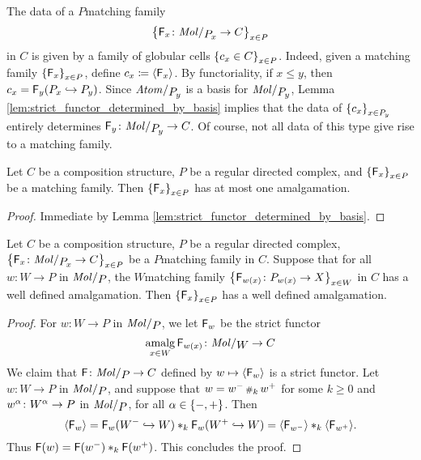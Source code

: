 \begin{rmk}\label{rmk:data_matching family}
    The data of a \( P \)\nbd matching family 
    \begin{equation*}
        \set{\F_x \colon \molecin{\imel{P}{x}} \to C}_{x \in P}
    \end{equation*}
    in \( C \) is given by a family of globular cells \( \left\{ {c_x \in C} \right\}_{x \in P} \).
    Indeed, given a matching family \( \left\{ {\mathsf{F}_x} \right\}_{x \in P} \), define \( c_x \coloneqq \langle\mathsf{F}_x\rangle \).
    By functoriality, if \( x \le y \), then \( c_x = \mathsf{F}_y({P}_{x} \hookrightarrow {P}_{y}) \).
    Since \( \atomin{\imel{P}{y}} \) is a basis for \( \molecin{\imel{P}{y}} \), Lemma \ref{lem:strict_functor_determined_by_basis} implies that the data of \( \left\{ {c_x} \right\}_{x \in {P}_{y}} \) entirely determines \( \F_y \colon \molecin{\imel{P}{y}} \to C \).
    Of course, not all data of this type give rise to a matching family. 
\end{rmk}

\begin{lem}\label{lem:at_most_one_lift}
    Let \( C \) be a composition structure, \( P \) be a regular directed complex, and \( \left\{ {\mathsf{F}_x} \right\}_{x \in P} \) be a matching family. 
    Then \( \left\{ {\mathsf{F}_x} \right\}_{x \in P} \) has at most one amalgamation.
\end{lem}
\begin{proof}
    Immediate by Lemma \ref{lem:strict_functor_determined_by_basis}.
\end{proof}

\begin{lem} \label{lem:well_define_from_regular_iff_well_defined_from_molecules}
    Let \( C \) be a composition structure, \( P \) be a regular directed complex, \( \set{\F_x \colon \molecin{\imel{P}{x}} \to C}_{x \in P} \) be a \( P \)\nbd matching family in \( C \). 
    Suppose that for all \( w \colon W \to P \) in \( \molecin{P} \), the \( W \)\nbd matching family \( \left\{ {\mathsf{F}_{w(x)} \colon {P}_{w(x)} \to X} \right\}_{x \in W} \) in \( C \) has a well defined amalgamation.
    Then \( \left\{ {\mathsf{F}_x} \right\}_{x \in P} \) has a well defined amalgamation.
\end{lem}
\begin{proof}
    For \( w \colon W \to P \) in \( \molecin{P} \), we let \( \mathsf{F}_w \) be the strict functor 
    \begin{equation*}
        \amalg_{x \in W} \F_{w(x)} \colon \molecin{W} \to C
    \end{equation*}
    We claim that \( \F \colon \molecin{P} \to C \) defined by \( w \mapsto \langle\mathsf{F}_w\rangle \) is a strict functor.
    Let \( w \colon W \to P \) in \( \molecin{P} \), and suppose that \( w = w^- \,{\scriptstyle\#}_{k}\, w^+ \) for some \( k \geq 0 \) and \( w^\alpha \colon W^\alpha \to P \) in \( \molecin{P} \), for all \( \alpha \in \left\{ {-, +} \right\} \).
    Then
    \begin{equation*}
        \langle\mathsf{F}_w\rangle = \mathsf{F}_w(W^- \hookrightarrow W) *_{k} \mathsf{F}_w(W^+ \hookrightarrow W) = \langle\mathsf{F}_{w^-}\rangle *_{k} \langle\mathsf{F}_{w^+}\rangle.
    \end{equation*}
    Thus \( \mathsf{F}(w) = \mathsf{F}(w^-) *_{k} \mathsf{F}(w^+) \).
    This concludes the proof.
\end{proof}

